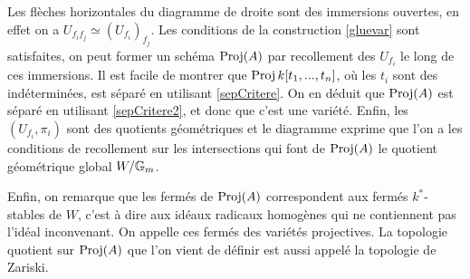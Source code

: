 Les flèches horizontales du diagramme de droite sont des immersions ouvertes, en effet on a $U_{f_if_j}\simeq (U_{f_i})_{f_j}$. Les conditions de la construction \ref{gluevar} sont satisfaites, on peut former un schéma $\operatorname{Proj}(A)$ par recollement des $U_{f_i}$ le long de ces immersions. Il est facile de montrer que $\operatorname{Proj} k[t_1,...,t_n]$, où les $t_i$ sont des indéterminées, est séparé en utilisant \ref{sepCritere}. On en déduit que $\operatorname{Proj}(A)$ est séparé en utilisant \ref{sepCritere2}, et donc que c'est une variété. Enfin, les $(U_{f_i},\pi_i)$ sont des quotients géométriques et le diagramme exprime que l'on a les conditions de recollement sur les intersections qui font de $\operatorname{Proj}(A)$ le quotient géométrique global $W/\mathbb{G}_m$. 

Enfin, on remarque que les fermés de $\operatorname{Proj}(A)$ correspondent aux fermés $k^*$-stables de $W$, c'est à dire aux idéaux radicaux homogènes qui ne contiennent pas l'idéal inconvenant. On appelle ces fermés des variétés projectives. La topologie quotient sur $\operatorname{Proj}(A)$ que l'on vient de définir est aussi appelé la topologie de Zariski.
